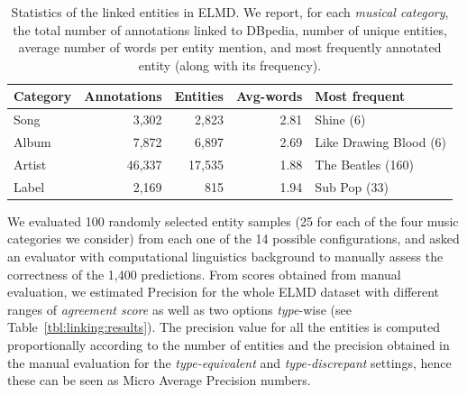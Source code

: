 \begin{table}[]
\scriptsize
\small
\centering
\def\arraystretch{1.2}
	\begin{tabular}{l r r r l}
\hline
\textbf{Category} & \textbf{Annotations} & \textbf{Entities} & \textbf{Avg-words} & \textbf{Most frequent} \\
\hline
Song & 3,302 & 2,823 & 2.81 & Shine (6) \\
Album & 7,872 & 6,897 & 2.69 & Like Drawing Blood (6) \\
Artist & 46,337 & 17,535 & 1.88 & The Beatles (160) \\
Label & 2,169 & 815 & 1.94 & Sub Pop (33) \\
\hline
	\end{tabular}
	\caption[Statistics of the linked entities in ELMD.]{Statistics of the linked entities in ELMD. We report, for each \textit{musical category}, the total number of annotations linked to DBpedia, number of unique entities, average number of words per entity mention, and most frequently annotated entity (along with its frequency).}
	\label{tbl:linking:statistics}
\end{table}


We evaluated 100 randomly selected entity samples (25 for each of the four music categories we consider) from each one of the 14 possible configurations, and asked an evaluator with computational linguistics background to manually assess the correctness of the 1,400 predictions. From scores obtained from manual evaluation, we estimated Precision for the whole \textsc{ELMD} dataset with different ranges of \textit{agreement score} as well as two options \textit{type}-wise (see Table~\ref{tbl:linking:results}). The precision value for all the entities is computed proportionally according to the number of entities and the precision obtained in the manual evaluation for the \textit{type-equivalent} and \textit{type-discrepant} settings, hence these can be seen as Micro Average Precision numbers.

